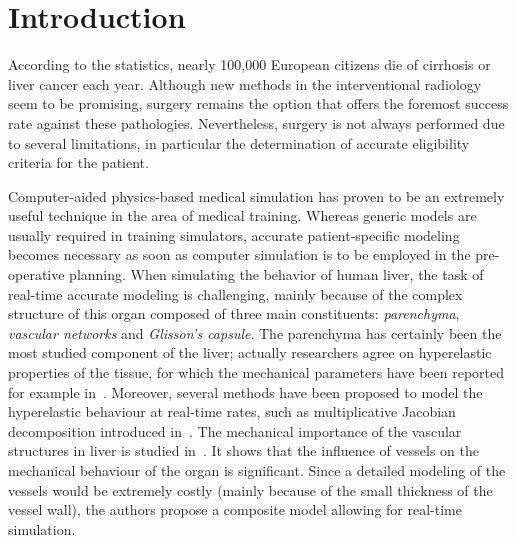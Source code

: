 \section{Introduction}%
\vspace{-6pt}
According to the statistics, nearly 100,000 European citizens die of cirrhosis or liver cancer each year. 
Although new methods 
in the interventional radiology 
seem to be promising, surgery remains the option that offers the foremost success rate against these pathologies. 
Nevertheless, surgery is not always performed due to several limitations, in particular the determination 
of accurate eligibility criteria for the patient. 

Computer-aided physics-based medical simulation has proven to be an extremely useful technique in the area of medical training. 
Whereas generic models are usually required in training simulators, accurate patient-specific modeling
becomes necessary as soon as computer simulation is to be employed in the pre-operative planning. 
When simulating the behavior of human liver, the task of real-time accurate modeling is challenging, mainly because of the complex structure 
of this organ composed of three main constituents: \emph{parenchyma}, \emph{vascular networks} and \emph{Glisson's capsule}.
The parenchyma has certainly been the most studied component of the liver; actually researchers agree on hyperelastic 
properties of the tissue, for which the mechanical parameters have been reported for example in~\cite{Kerdok2006}.%
Moreover, several methods have been proposed to model the hyperelastic behaviour at real-time rates, such as multiplicative Jacobian decomposition
introduced in~\cite{Marchesseau2010}.
%
The mechanical importance of the vascular structures in liver is studied in~\cite{Peterlik2012}. It shows that the 
influence of vessels on the mechanical behaviour of the organ is significant. %
Since a detailed modeling of the vessels would be extremely costly (mainly because of the small thickness of the vessel wall), 
the authors propose a composite model allowing for real-time simulation.

